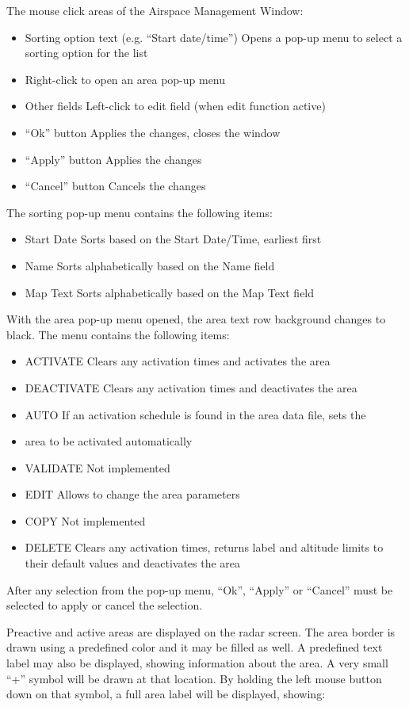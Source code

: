 \documentclass[11pt,a4paper,oldfontcommands]{memoir}
\begin{document}
The mouse click areas of the Airspace Management Window:
\begin{itemize}[\textbullet] 
    \item Sorting option text (e.g. “Start date/time”) Opens a pop-up menu to select a sorting option for the list 
    \item Right-click to open an area pop-up menu
    \item Other fields Left-click to edit field (when edit function active)
    \item “Ok” button Applies the changes, closes the window
    \item “Apply” button Applies the changes
    \item “Cancel” button Cancels the changes 
\end{itemize}

The sorting pop-up menu contains the following items:
\begin{itemize}[\textbullet] 
    \item Start Date Sorts based on the Start Date/Time, earliest first
    \item Name Sorts alphabetically based on the Name field
    \item Map Text Sorts alphabetically based on the Map Text field 
\end{itemize}
With the area pop-up menu opened, the area text row background changes to black. The menu contains the following items:
\begin{itemize}[\textbullet] 
    \item ACTIVATE Clears any activation times and activates the area
    \item DEACTIVATE Clears any activation times and deactivates the area
    \item AUTO If an activation schedule is found in the area data file, sets the
    \item area to be activated automatically
    \item VALIDATE Not implemented
    \item EDIT Allows to change the area parameters
    \item COPY Not implemented
    \item DELETE Clears any activation times, returns label and altitude limits to their default values and deactivates the area
\end{itemize}
After any selection from the pop-up menu, “Ok”, “Apply” or “Cancel” must be selected to apply or cancel the selection. 

Preactive and active areas are displayed on the radar screen. The area border is drawn using a predefined color and it may be filled as well. A predefined text label may also be displayed, showing information about the area. A very small “+” symbol will be drawn at that location. By holding the left mouse button down on that symbol, a full area label will be displayed, showing:
\end{document}

